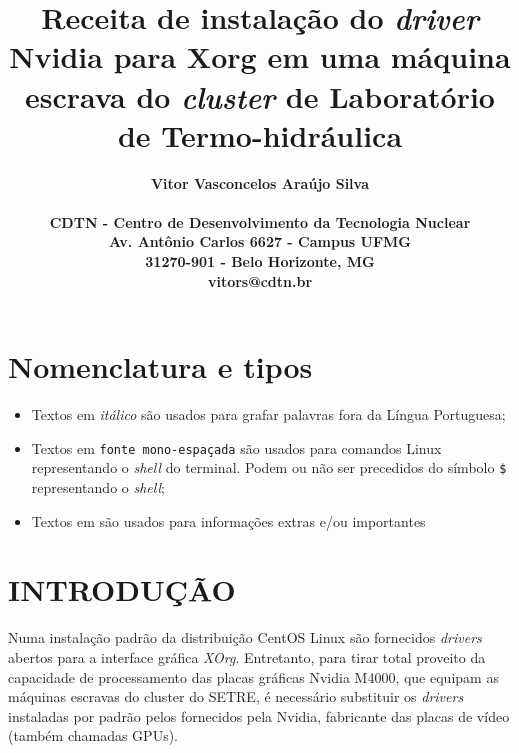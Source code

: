 \documentclass[twoside,a4paper,12pt,english]{inac17}
\title{Receita de instalação do \textit{driver} Nvidia para Xorg em uma máquina escrava do \textit{cluster} de Laboratório de Termo-hidráulica}
\author{
  \bf{Vitor Vasconcelos Ara\'ujo Silva}\\ \\
  CDTN - Centro de Desenvolvimento da Tecnologia Nuclear\\
  Av. Ant\^onio Carlos 6627 - Campus UFMG\\
  31270-901 - Belo Horizonte, MG\\
  vitors@cdtn.br}
\begin{document}
\maketitle



\pagestyle{myheadings}
\thispagestyle{empty}
\markboth{}{}


\thispagestyle{empty}

\begin{abstract_full_paper}
\end{abstract_full_paper}

\section*{Nomenclatura e tipos}
\begin{itemize}
\item Textos em \textit{itálico} são usados para grafar palavras fora da Língua Portuguesa;
\item Textos em \texttt{fonte mono-espaçada} são usados para comandos Linux 
representando o \textit{shell} do terminal. Podem ou não ser precedidos do 
símbolo \texttt{\$} representando o \textit{shell};
\item Textos em  são usados para informações extras e/ou importantes
\end{itemize}
\section{INTRODUÇÃO}\label{int}

Numa instalação padrão da distribuição CentOS Linux são fornecidos \textit{drivers} 
abertos para a interface gráfica \textit{XOrg}. Entretanto, para tirar total proveito 
da capacidade de processamento das placas gráficas Nvidia M4000, 
que equipam as máquinas escravas do cluster do SETRE, é necessário 
substituir os \textit{drivers} instaladas por padrão pelos fornecidos pela 
Nvidia, fabricante das placas de vídeo (também chamadas GPUs). 
\end{document}
